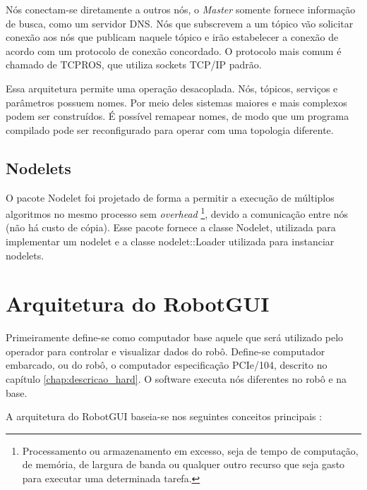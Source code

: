 Nós conectam-se diretamente a outros nós, o \textit{Master} somente fornece informação de busca, como um servidor DNS. Nós que subscrevem a um tópico vão solicitar conexão aos nós que publicam naquele tópico e irão estabelecer a conexão de acordo com um protocolo de conexão concordado. O protocolo mais comum é chamado de TCPROS, que utiliza sockets TCP/IP padrão.

Essa arquitetura permite uma operação desacoplada. Nós, tópicos, serviços e parâmetros possuem nomes. Por meio deles sistemas maiores e mais complexos podem ser construídos. É possível remapear nomes, de modo que um programa compilado  pode ser reconfigurado para operar com uma topologia diferente. 


\subsection{Nodelets}
O pacote Nodelet foi projetado de forma a permitir a execução de múltiplos algoritmos no mesmo processo sem \textit{overhead} \footnote{Processamento ou armazenamento em excesso, seja de tempo de computação, de memória, de largura de banda ou qualquer outro recurso que seja gasto para executar uma determinada tarefa.}, devido a comunicação entre nós (não há custo de cópia). Esse pacote fornece a classe Nodelet, utilizada para implementar um nodelet e a classe nodelet::Loader utilizada para instanciar nodelets. 

\section{Arquitetura do RobotGUI}

Primeiramente define-se como computador base aquele que será utilizado pelo operador para controlar e visualizar dados do robô. Define-se computador embarcado, ou do robô, o computador especificação PCIe/104, descrito no capítulo \ref{chap:descricao_hard}. O software executa nós diferentes no robô e na base.

A arquitetura do RobotGUI baseia-se nos seguintes conceitos principais \cite{doris_software_architecture}:

